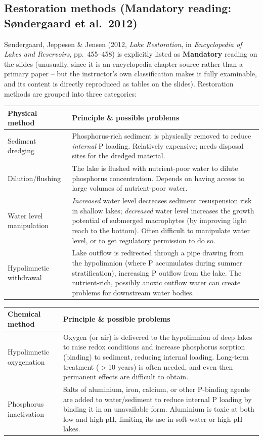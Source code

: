\documentclass[11pt,a4paper]{article}
\begin{document}
\subsection{Restoration methods (Mandatory reading: S\o{}ndergaard et al.\ 2012)}
S\o{}ndergaard, Jeppesen \& Jensen (2012, \textit{Lake Restoration}, in \textit{Encyclopedia of Lakes and Reservoirs}, pp.\ 455--458) is explicitly listed as \textbf{Mandatory} reading on the slides (unusually, since it is an encyclopedia-chapter source rather than a primary paper -- but the instructor's own classification makes it fully examinable, and its content is directly reproduced as tables on the slides). Restoration methods are grouped into three categories:

\begin{center}
\begin{tabularx}{\textwidth}{@{}l X@{}}
\toprule
\textbf{Physical method} & \textbf{Principle \& possible problems} \\
\midrule
Sediment dredging & Phosphorus-rich sediment is physically removed to reduce \emph{internal} P loading. Relatively expensive; needs disposal sites for the dredged material. \\
Dilution/flushing & The lake is flushed with nutrient-poor water to dilute phosphorus concentration. Depends on having access to large volumes of nutrient-poor water. \\
Water level manipulation & \emph{Increased} water level decreases sediment resuspension risk in shallow lakes; \emph{decreased} water level increases the growth potential of submerged macrophytes (by improving light reach to the bottom). Often difficult to manipulate water level, or to get regulatory permission to do so. \\
Hypolimnetic withdrawal & Lake outflow is redirected through a pipe drawing from the hypolimnion (where P accumulates during summer stratification), increasing P outflow from the lake. The nutrient-rich, possibly anoxic outflow water can create problems for downstream water bodies. \\
\bottomrule
\end{tabularx}
\end{center}

\begin{center}
\begin{tabularx}{\textwidth}{@{}l X@{}}
\toprule
\textbf{Chemical method} & \textbf{Principle \& possible problems} \\
\midrule
Hypolimnetic oxygenation & Oxygen (or air) is delivered to the hypolimnion of deep lakes to raise redox conditions and increase phosphorus sorption (binding) to sediment, reducing internal loading. Long-term treatment ($>$10 years) is often needed, and even then permanent effects are difficult to obtain. \\
Phosphorus inactivation & Salts of aluminium, iron, calcium, or other P-binding agents are added to water/sediment to reduce internal P loading by binding it in an unavailable form. Aluminium is toxic at both low and high pH, limiting its use in soft-water or high-pH lakes. \\
\bottomrule
\end{tabularx}
\end{center}
\end{document}
